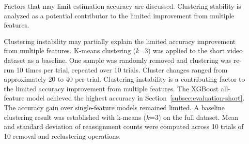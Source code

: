 Factors that may limit estimation accuracy are discussed.
Clustering stability is analyzed as a potential contributor to the limited improvement from multiple features.


%

%
Clustering instability may partially explain the limited accuracy improvement from multiple features.
K-means clustering ($k$=3) was applied to the short video dataset as a baseline.
One sample was randomly removed and clustering was re-run 10 times per trial, repeated over 10 trials.
Cluster changes ranged from approximately 20 to 40 per trial.
Clustering instability is a contributing factor to the limited accuracy improvement from multiple features.
The XGBoost all-feature model achieved the highest accuracy in Section~\ref{subsec:evaluation-short}.
The accuracy gain over single-feature models remained limited.
A baseline clustering result was established with k-means ($k$=3) on the full dataset.
Mean and standard deviation of reassignment counts were computed across 10 trials of 10 removal-and-reclustering operations.
